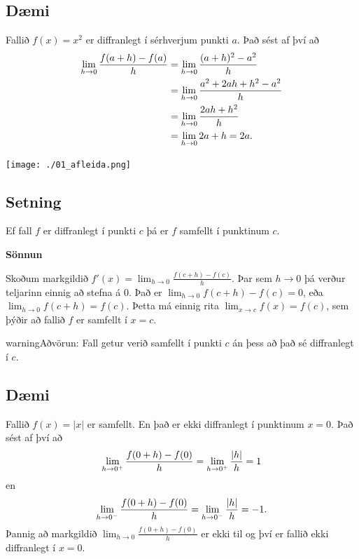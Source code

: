 \documentclass[a4paper,10pt,icelandic]{sphinxmanual}
\begin{document}
\subsection{Dæmi}
\label{kafli03:daemi}
Fallið \(f(x) = x^2\) er diffranlegt í sérhverjum punkti \(a\).
Það sést af því að
\begin{gather}
\begin{split}\begin{aligned}
\lim_{h\to 0} \frac{f(a+h)-f(a)}{h}
&= \lim_{h\to 0} \frac{(a+h)^2-a^2}{h}\\
&= \lim_{h\to 0} \frac{a^2+2ah+h^2-a^2}{h}\\
&= \lim_{h\to 0} \frac{2ah+h^2}{h}\\
&= \lim_{h\to 0} 2a+h = 2a.\end{aligned}\end{split}\notag
\end{gather}

\begin{center}
\texttt{[image: ./01\_afleida.png]}
\end{center}



\subsection{Setning}
\label{kafli03:setning}
Ef fall \(f\) er diffranlegt í punkti \(c\) þá er \(f\)
samfellt í punktinum \(c\).

\textbf{Sönnun}

Skoðum markgildið \(f'(x)=\lim_{h\to 0} \frac{f(c+h)-f(c)}{h}\). Þar
sem \(h\to 0\) þá verður teljarinn einnig að stefna á 0. Það er
\(\lim_{h \to 0} f(c+h)-f(c) = 0\), eða
\(\lim_{h \to 0} f(c+h) = f(c)\). Þetta má einnig rita
\(\lim_{x \to c} f(x) = f(c)\), sem þýðir að fallið \(f\) er
samfellt í \(x=c\).

\begin{notice}{warning}{Aðvörun:}
Fall getur verið samfellt í punkti \(c\) án þess að það sé
diffranlegt í \(c\).
\end{notice}


\subsection{Dæmi}
\label{kafli03:id1}
Fallið \(f(x) = |x|\) er samfellt. En það er ekki diffranlegt í
punktinum \(x=0\). Það sést af því að
\begin{gather}
\begin{split}\lim_{h\to 0^+} \frac{f(0+h)-f(0)}{h} = \lim_{h\to 0^+} \frac{|h|}{h} = 1\end{split}\notag
\end{gather}
en
\begin{gather}
\begin{split}\lim_{h\to 0^-} \frac{f(0+h)-f(0)}{h} = \lim_{h\to 0^-} \frac{|h|}{h} = -1.\end{split}\notag
\end{gather}
Þannig að markgildið \(\lim_{h\to 0} \frac{f(0+h)-f(0)}{h}\) er ekki til og því er
fallið ekki diffranlegt í \(x=0\).
\end{document}
